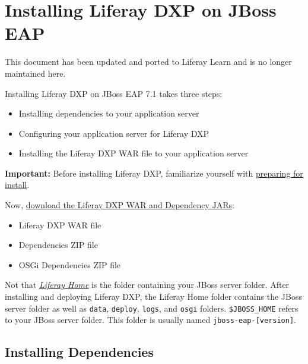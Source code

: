 \chapter{Installing Liferay DXP on JBoss
EAP}\label{installing-liferay-dxp-on-jboss-eap}

{This document has been updated and ported to Liferay Learn and is no
longer maintained here.}

Installing Liferay DXP on JBoss EAP 7.1 takes three steps:

\begin{itemize}
\tightlist
\item
  Installing dependencies to your application server
\item
  Configuring your application server for Liferay DXP
\item
  Installing the Liferay DXP WAR file to your application server
\end{itemize}

\noindent\hrulefill

\textbf{Important:} Before installing Liferay DXP, familiarize yourself
with
\href{/docs/7-2/deploy/-/knowledge_base/d/preparing-for-install}{preparing
for install}.

\noindent\hrulefill

Now,
\href{/docs/7-2/deploy/-/knowledge_base/d/obtaining-product\#downloading-the-liferay-war-and-dependency-jars}{download
the Liferay DXP WAR and Dependency JARs}:

\begin{itemize}
\tightlist
\item
  Liferay DXP WAR file
\item
  Dependencies ZIP file
\item
  OSGi Dependencies ZIP file
\end{itemize}

Not that
\href{/docs/7-2/deploy/-/knowledge_base/d/liferay-home}{\emph{Liferay
Home}} is the folder containing your JBoss server folder. After
installing and deploying Liferay DXP, the Liferay Home folder contains
the JBoss server folder as well as \texttt{data}, \texttt{deploy},
\texttt{logs}, and \texttt{osgi} folders. \texttt{\$JBOSS\_HOME} refers
to your JBoss server folder. This folder is usually named
\texttt{jboss-eap-{[}version{]}}.

\section{Installing Dependencies}\label{installing-dependencies}

